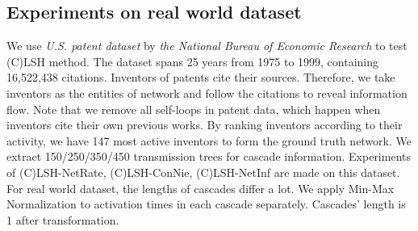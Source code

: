 \subsection{Experiments on real world dataset}
We use \emph{U.S. patent dataset} by \emph{the National Bureau of Economic Research} to test (C)LSH method. The dataset spans 25 years from 1975 to 1999, containing 16,522,438 citations. Inventors of patents cite their sources. Therefore, we take inventors as the entities of network and follow the citations to reveal information flow. Note that we remove all self-loops in patent data, which happen when inventors cite their own previous works. By ranking inventors according to their activity, we have 147 most active inventors to form the ground truth network. We extract 150/250/350/450 transmission trees for cascade information. Experiments of (C)LSH-NetRate, (C)LSH-ConNie, (C)LSH-NetInf are made on this dataset. 
\\For real world dataset, the lengths of cascades differ a lot. We apply Min-Max Normalization to activation times in each cascade separately. Cascades' length is 1 after transformation.
